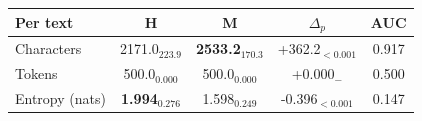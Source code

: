 \begin{tabular}{lcccc}
\toprule
\textbf{Per text} & \textbf{H} & \textbf{M} & \textbf{$\Delta_p$} & \textbf{AUC} \\
\midrule
Characters & 2171.0$_{223.9}$ & \textbf{2533.2}$_{170.3}$ & +362.2$_{<0.001}$ & 0.917 \\
Tokens & 500.0$_{0.000}$ & 500.0$_{0.000}$ & +0.000$_{-}$ & 0.500 \\
Entropy (nats) & \textbf{1.994}$_{0.276}$ & 1.598$_{0.249}$ & -0.396$_{<0.001}$ & 0.147 \\
\bottomrule
\end{tabular}
